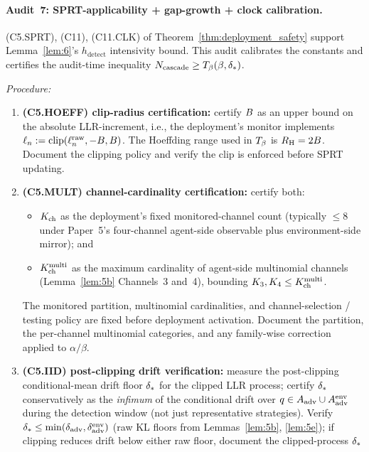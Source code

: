\paragraph{Audit~7: SPRT-applicability + gap-growth + clock
calibration.}

(C5.SPRT), (C11), (C11.CLK) of Theorem~\ref{thm:deployment_safety}
support Lemma~\ref{lem:6}'s $h_{\mathrm{detect}}$ intensivity bound.
This audit calibrates the constants and certifies the audit-time
inequality $N_{\mathrm{cascade}} \geq T_{\beta}(\beta, \delta_{*})$.

\emph{Procedure:}
\begin{enumerate}
\item \textbf{(C5.HOEFF) clip-radius certification:} certify
  $B$ as an upper bound on the absolute LLR-increment, i.e.,
  the deployment's monitor implements
  $\ell_n := \mathrm{clip}(\ell_n^{\mathrm{raw}}, -B, B)$.
  The Hoeffding range used in $T_{\beta}$ is $R_{\mathrm{H}} = 2B$.
  Document the clipping policy and verify the clip is enforced
  before SPRT updating.
\item \textbf{(C5.MULT) channel-cardinality certification:}
  certify both:
  \begin{itemize}
  \item $K_{\mathrm{ch}}$ as the deployment's fixed monitored-channel count
    (typically $\leq 8$ under Paper~5's four-channel agent-side
    observable plus environment-side mirror); and
  \item $K_{\mathrm{ch}}^{\mathrm{multi}}$ as the maximum cardinality of agent-side
    multinomial channels (Lemma~\ref{lem:5b} Channels~3 and~4),
    bounding $K_3, K_4 \leq K_{\mathrm{ch}}^{\mathrm{multi}}$.
  \end{itemize}
  The monitored partition, multinomial cardinalities, and
  channel-selection / testing policy are fixed before deployment
  activation.  Document the partition, the per-channel
  multinomial categories, and any family-wise correction applied
  to $\alpha/\beta$.
\item \textbf{(C5.IID) post-clipping drift verification:} measure
  the post-clipping conditional-mean drift floor $\delta_{*}$ for
  the clipped LLR process; certify $\delta_{*}$ conservatively as
  the \emph{infimum} of the conditional drift over $q \in A_{\mathrm{adv}}
  \cup A_{\mathrm{adv}}^{\mathrm{env}}$ during the detection window (not just
  representative strategies).  Verify $\delta_{*} \leq \min(\delta_{\mathrm{adv}},
  \delta_{\mathrm{adv}}^{\mathrm{env}})$ (raw KL floors from
  Lemmas~\ref{lem:5b}, \ref{lem:5e}); if clipping reduces drift
  below either raw floor, document the clipped-process $\delta_{*}$

\end{enumerate}
